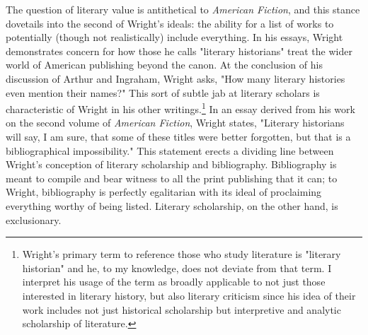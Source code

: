 The question of literary value is antithetical to \textit{American Fiction}, and this stance dovetails into the second of Wright's ideals: the ability for a list of works to potentially (though not realistically) include everything. In his essays, Wright demonstrates concern for how those he calls "literary historians" treat the wider world of American publishing beyond the canon. At the conclusion of his discussion of Arthur and Ingraham, Wright asks, "How many literary histories even mention their names?"\autocite[312]{wright_statistical_1939} This sort of subtle jab at literary scholars is characteristic of Wright in his other writings.\footnote{Wright's primary term to reference those who study literature is "literary historian" and he, to my knowledge, does not deviate from that term. I interpret his usage of the term as broadly applicable to not just those interested in literary history, but also literary criticism since his idea of their work includes not just historical scholarship but interpretive and analytic scholarship of literature.} In an essay derived from his work on the second volume of \textit{American Fiction}, Wright states, "Literary historians will say, I am sure, that some of these titles were better forgotten, but that is a bibliographical impossibility." \autocite[75]{wright_few_1955} This statement erects a dividing line between Wright's conception of literary scholarship and bibliography. Bibliography is meant to compile and bear witness to all the print publishing that it can; to Wright, bibliography is perfectly egalitarian with its ideal of proclaiming everything worthy of being listed. Literary scholarship, on the other hand, is exclusionary. 

